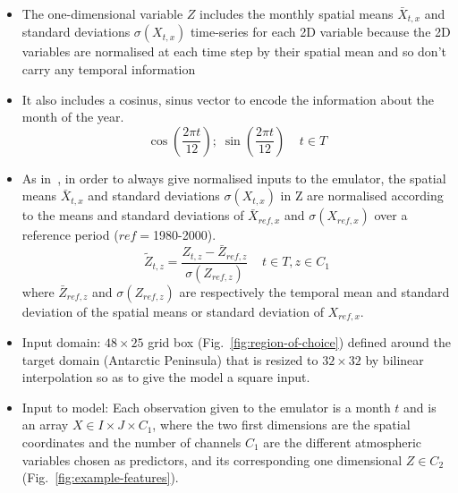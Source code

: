 \documentclass[a4paper,11pt,oneside]{report}
\begin{document}
\begin{itemize}
\item The one-dimensional variable $Z$ includes the monthly spatial means $\bar{X}_{t,x}$ and standard deviations $\sigma(X_{t,x})$ time-series for each 2D variable because the 2D variables are normalised at each time step by their spatial mean and so don’t carry any temporal information
\item It also includes a cosinus, sinus vector to encode the information about the month of the year.
\begin{equation}
    \operatorname{cos}\left(\frac{2\pi t}{12}\right);\; \operatorname{sin}\left(\frac{2\pi t}{12}\right) \;\;\;\; t\in T
\end{equation}
\item As in~\cite{Doury}, in order to always give normalised inputs to the emulator, the spatial means $\bar{X}_{t,x}$ and standard deviations $\sigma(X_{t,x})$ in Z are normalised according to the means and standard deviations of $\bar{X}_{ref,x}$ and $\sigma(X_{ref,x})$ over a reference period ($ref=$1980-2000).
\begin{equation}\label{eq:normalisation-Z}
    \tilde{Z}_{t,z} = \frac{Z_{t,z}-\bar{Z}_{ref,z}}{\sigma(Z_{ref,z})} \;\;\;\; t\in T, z\in C_1
\end{equation}
where $\bar{Z}_{ref,z}$ and $\sigma(Z_{ref,z})$ are respectively the temporal mean and standard deviation of the spatial means or standard deviation of $X_{ref, x}$.
 \item Input domain: $48\times25$ grid box (Fig.~\ref{fig:region-of-choice}) defined around the target domain (Antarctic Peninsula) that is resized to $32\times 32$ by bilinear interpolation so as to give the model a square input.
\item Input to model: Each observation given to the emulator is a month $t$ and is an array $X \in I \times J \times C_1$, where the two first dimensions are the spatial coordinates and the number of channels $C_1$ are the different atmospheric variables chosen as predictors, and its corresponding one dimensional $Z \in C_2$ (Fig.~\ref{fig:example-features}).
\end{itemize}


\end{document}
